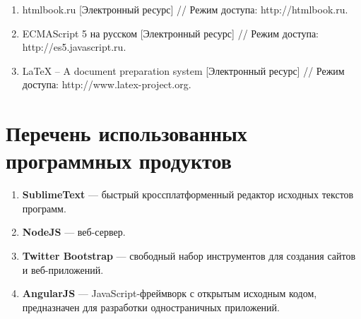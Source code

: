 \documentclass[14pt,a4paper]{report}
\makeatletter
\newif\if@prechapterused
\let\oldchapter\chapter
\renewcommand{\chapter}[1]
{
\if@prechapterused\vspace{-2em}\@prechapterusedfalse\fi
\begingroup
	\let\clearpage\relax
	\let\cleardoublepage\relax
	\oldchapter{#1}
\endgroup
}
\makeatother
\begin{document}
\begin{enumerate}
  \item htmlbook.ru [Электронный ресурс] // Режим доступа: http://htmlbook.ru.
  \item ECMAScript 5 на русском [Электронный ресурс] // Режим доступа: http://es5.javascript.ru.
  \item LaTeX -- A document preparation system [Электронный ресурс] // Режим доступа: http://www.latex-project.org.
\end{enumerate}

\chapter{Перечень использованных программных продуктов}

\begin{enumerate}
  \item \textbf{SublimeText} --- быстрый кроссплатформенный редактор исходных 
  текстов программ.
  \item \textbf{NodeJS} --- веб-сервер.
  \item \textbf{Twitter Bootstrap} --- свободный набор инструментов для создания сайтов и веб-приложений.
  \item \textbf{AngularJS} ---  JavaScript-фреймворк с открытым исходным кодом, предназначен для разработки одностраничных приложений.
\end{enumerate}
\end{document}
